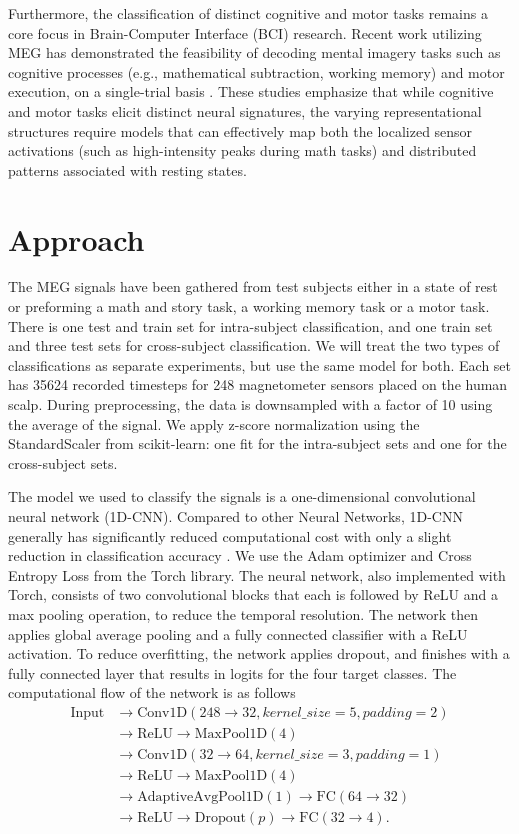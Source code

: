 \documentclass[conference]{IEEEtran}
\begin{document}
Furthermore, the classification of distinct cognitive and motor tasks remains a core focus in Brain-Computer Interface (BCI) research.
Recent work utilizing MEG has demonstrated the feasibility of decoding mental imagery tasks such as cognitive processes (e.g., mathematical subtraction, working memory) and motor execution, on a single-trial basis \cite{Raza2023}.
These studies emphasize that while cognitive and motor tasks elicit distinct neural signatures, the varying representational structures require models that can effectively map both the localized sensor activations (such as high-intensity peaks during math tasks) and distributed patterns associated with resting states.


\section{Approach}
The MEG signals have been gathered from test subjects either in a state of rest or preforming a math and story task, a working memory task or a motor task.
There is one test and train set for intra-subject classification, and one train set and three test sets for cross-subject classification. We will treat the two types of classifications as separate experiments, but use the same model for both.
Each set has 35624 recorded timesteps for 248 magnetometer sensors placed on the human scalp.
During preprocessing, the data is downsampled with a factor of 10 using the average of the signal. We apply z-score normalization using the StandardScaler from scikit-learn: one fit for the intra-subject sets and one for the cross-subject sets.

The model we used to classify the signals is a one-dimensional convolutional neural network (1D-CNN). Compared to other Neural Networks, 1D-CNN generally has significantly reduced computational cost with only a slight reduction in classification accuracy \cite{app15073593}.
We use the Adam optimizer and Cross Entropy Loss from the Torch library. The neural network, also implemented with Torch, consists of two convolutional blocks that each is followed by ReLU and a max pooling operation, to reduce the temporal resolution.
The network then applies global average pooling and a fully connected classifier with a ReLU activation. To reduce overfitting, the network applies dropout, and finishes with a fully connected layer that results in logits for the four target classes.
The computational flow of the network is as follows
\[
\begin{aligned}
\text{Input}
&\rightarrow \mathrm{Conv1D}(248\rightarrow32,kernel\_size=5,padding=2) \\
&\rightarrow \mathrm{ReLU}
\rightarrow \mathrm{MaxPool1D}(4) \\
&\rightarrow \mathrm{Conv1D}(32\rightarrow64,kernel\_size=3,padding=1) \\
& \rightarrow \mathrm{ReLU}
\rightarrow \mathrm{MaxPool1D}(4) \\
&\rightarrow \mathrm{AdaptiveAvgPool1D}(1)
\rightarrow \mathrm{FC}(64\rightarrow32) \\
&\rightarrow \mathrm{ReLU}
\rightarrow \mathrm{Dropout}(p)
\rightarrow \mathrm{FC}(32\rightarrow4).
\end{aligned}
\]
\end{document}
